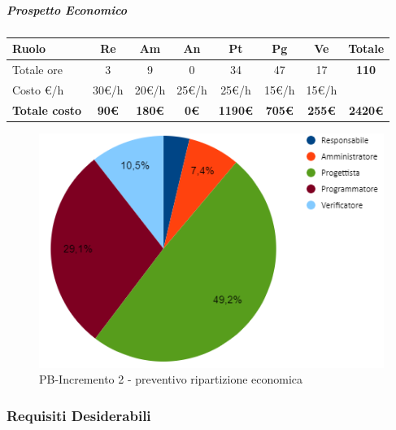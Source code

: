 \subparagraph{Prospetto Economico}
\begin{center}
	\renewcommand{\arraystretch}{1.8} %
	\begin{tabular}{ |m{10em}|c|c|c|c|c|c|c| }
	\hline
	\textbf{Ruolo} & \textbf{Re} & \textbf{Am} &  \textbf{An} &  \textbf{Pt} &  \textbf{Pg} &  \textbf{Ve} &  \textbf{Totale}\\
    \hline
    Totale ore & 3 & 9 & 0 & 34 & 47 & 17 & \textbf{110}\\
    \hline
    Costo \euro/h & 30\euro/h & 20\euro/h & 25\euro/h & 25\euro/h & 15\euro/h & 15\euro/h & \\
    \hline
    \textbf{Totale costo} & \textbf{90\euro} & \textbf{180\euro} &  \textbf{0\euro} &  \textbf{1190\euro} &  \textbf{705\euro} &  \textbf{255\euro} &  \textbf{2420\euro}\\
    \hline
	\end{tabular}

    \begin{figure}[H]
       \centering\includegraphics{images/preventivo/PB-incremento2-costo.png}
       \caption{PB-Incremento 2 - preventivo ripartizione economica}
    \end{figure}
\end{center}


\subsubsection{Requisiti Desiderabili}

